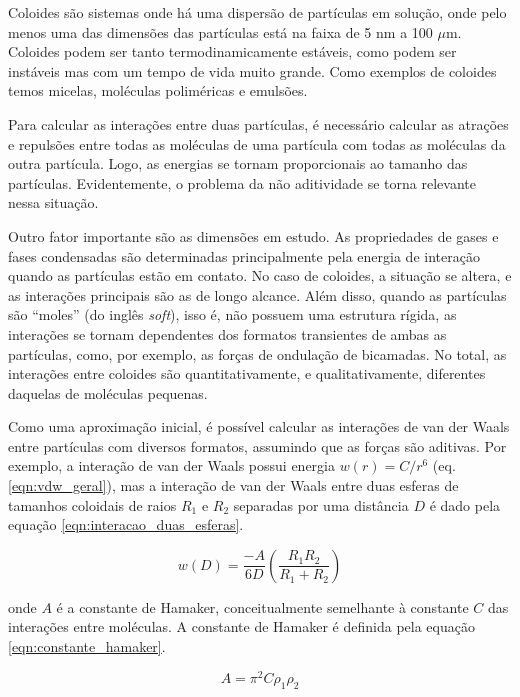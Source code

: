 	Coloides são sistemas onde há uma dispersão de partículas em solução, onde pelo menos uma das dimensões das partículas está na faixa de 5 nm a 100 \(\mu\)m. Coloides podem ser tanto termodinamicamente estáveis, como podem ser instáveis mas com um tempo de vida muito grande. Como exemplos de coloides temos micelas, moléculas poliméricas e emulsões. %
	
	Para calcular as interações entre duas partículas, é necessário calcular as atrações e repulsões entre todas as moléculas de uma partícula com todas as moléculas da outra partícula. Logo, as energias se tornam proporcionais ao tamanho das partículas. Evidentemente, o problema da não aditividade se torna relevante nessa situação.
	
	Outro fator importante são as dimensões em estudo. As propriedades de gases e fases condensadas são determinadas principalmente pela energia de interação quando as partículas estão em contato. No caso de coloides, a situação se altera, e as interações principais são as de longo alcance. Além disso, quando as partículas são ``moles'' (do inglês \emph{soft}), isso é, não possuem uma estrutura rígida, as interações se tornam dependentes dos formatos transientes de ambas as partículas, como, por exemplo, as forças de ondulação de bicamadas. No total, as interações entre coloides são quantitativamente, e qualitativamente, diferentes daquelas de moléculas pequenas. %
	
	Como uma aproximação inicial, é possível calcular as interações de van der Waals entre partículas com diversos formatos, assumindo que as forças são aditivas. Por exemplo, a interação de van der Waals possui energia \(w(r) = C/r^6\) (eq. \ref{eqn:vdw_geral}), mas a interação de van der Waals entre duas esferas de tamanhos coloidais de raios \(R_1\) e \(R_2\) separadas por uma distância \(D\) é dado pela equação \ref{eqn:interacao_duas_esferas}.
	
	\begin{equation}
		w(D) = \dfrac{-A}{6D} \left( \dfrac{R_1R_2}{R_1 + R_2}   \right)
		\label{eqn:interacao_duas_esferas}
	\end{equation}
	
	\noindent onde \(A\) é a constante de Hamaker, conceitualmente semelhante à constante \(C\) das interações entre moléculas. A constante de Hamaker é  definida pela equação \ref{eqn:constante_hamaker}.
	
	\begin{equation}
		A = \pi^2 C \rho_1 \rho_2
		\label{eqn:constante_hamaker}
	\end{equation}
	
